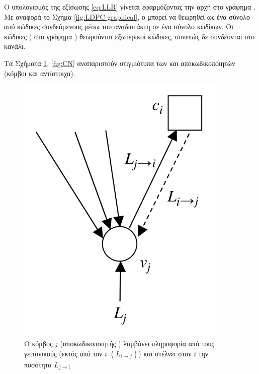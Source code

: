Ο υπολογισμός της εξίσωσης \ref{eq:LLR} γίνεται εφαρμόζοντας την αρχή  στο γράφημα . Με αναφορά το Σχήμα \ref{fig:LDPC graphical}, ο  μπορεί να θεωρηθεί ως ένα σύνολο από  κώδικες συνδεόμενους μέσω του αναδιατάκτη σε ένα σύνολο  κωδίκων. Οι  κώδικες ( στο γράφημα ) θεωρούνται εξωτερικοί κώδικες, συνεπώς δε συνδέονται στο κανάλι.

Τα Σχήματα \ref{fig:VN}, \ref{fig:CN} αναπαριστούν στιγμιότυπα των  και  αποκωδικοποιητών (κόμβοι  και  αντίστοιχα).

\begin{figure}[h]
    \centering
    \begin{minipage}{0.45\textwidth}
        \centering
        \includegraphics[width=0.9\textwidth]{figures/VN.png}
        \caption{Ο κόμβος  $j$ (αποκωδικοποιητής ) λαμβάνει πληροφορία από τους γειτονικούς  (εκτός από τον $i$ $(L_{i\to j})$) και στέλνει στον  $i$ την ποσότητα $L_{j\to i}$}
        \label{fig:VN}
    \end{minipage}\hfill
    \begin{minipage}{0.45\textwidth}

\end{minipage}
\end{figure}
